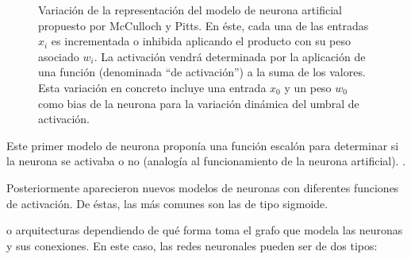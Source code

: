\begin{figure}
	\caption[Modelo de neurona artificial de McCulloch y Pitts]{Variación de la representación del modelo de neurona artificial propuesto por McCulloch y Pitts. En éste, cada una de las entradas $x_i$ es incrementada o inhibida aplicando el producto con su peso asociado $w_i$. La activación vendrá determinada por la aplicación de una función (denominada \enquote{de activación}) a la suma de los valores. Esta variación en concreto incluye una entrada $x_0$ y un peso $w_0$ como bias de la neurona para la variación dinámica del umbral de activación.}
	\label{fig:mccullocs-pitts-neuron-model}
\end{figure}

Este primer modelo de neurona proponía una función escalón para determinar si la neurona se activaba o no (analogía al funcionamiento de la neurona artificial). .

Posteriormente aparecieron nuevos modelos de neuronas con diferentes funciones de activación. De éstas, las más comunes son las de tipo sigmoide.

 o arquitecturas dependiendo de qué forma toma el grafo que modela las neuronas y sus conexiones. En este caso, las redes neuronales pueden ser de dos tipos:

